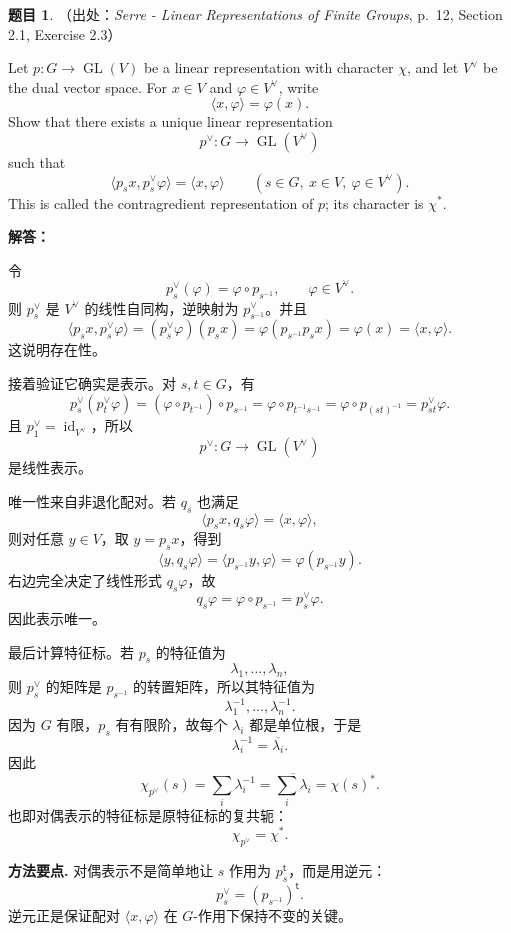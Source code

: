 \documentclass[a4paper]{ctexart}
\theoremstyle{definition}
\newtheorem{example}{题目}[section]
\theoremstyle{analysis}
\theoremstyle{plain}
\begin{document}
\begin{example}
（出处：\textit{Serre - Linear Representations of Finite Groups}, p.~12, Section 2.1, Exercise 2.3）

Let \(p:G\to \operatorname{GL}(V)\) be a linear representation with character
\(\chi\), and let \(V^\vee\) be the dual vector space. For \(x\in V\) and
\(\varphi\in V^\vee\), write
\[
  \langle x,\varphi\rangle=\varphi(x).
\]
Show that there exists a unique linear representation
\[
  p^\vee:G\to \operatorname{GL}(V^\vee)
\]
such that
\[
  \langle p_sx,p^\vee_s\varphi\rangle=\langle x,\varphi\rangle
  \qquad
  (s\in G,\ x\in V,\ \varphi\in V^\vee).
\]
This is called the contragredient representation of \(p\); its character is
\(\chi^*\).

\textbf{解答：}

令
\[
  p^\vee_s(\varphi)=\varphi\circ p_{s^{-1}},
  \qquad \varphi\in V^\vee.
\]
则 \(p^\vee_s\) 是 \(V^\vee\) 的线性自同构，逆映射为 \(p^\vee_{s^{-1}}\)。并且
\[
  \langle p_sx,p^\vee_s\varphi\rangle
  =
  (p^\vee_s\varphi)(p_sx)
  =
  \varphi(p_{s^{-1}}p_sx)
  =
  \varphi(x)
  =
  \langle x,\varphi\rangle.
\]
这说明存在性。

接着验证它确实是表示。对 \(s,t\in G\)，有
\[
  p^\vee_s(p^\vee_t\varphi)
  =
  (\varphi\circ p_{t^{-1}})\circ p_{s^{-1}}
  =
  \varphi\circ p_{t^{-1}s^{-1}}
  =
  \varphi\circ p_{(st)^{-1}}
  =
  p^\vee_{st}\varphi.
\]
且 \(p^\vee_1=\operatorname{id}_{V^\vee}\)，所以
\[
  p^\vee:G\to \operatorname{GL}(V^\vee)
\]
是线性表示。

唯一性来自非退化配对。若 \(q_s\) 也满足
\[
  \langle p_sx,q_s\varphi\rangle=\langle x,\varphi\rangle,
\]
则对任意 \(y\in V\)，取 \(y=p_sx\)，得到
\[
  \langle y,q_s\varphi\rangle
  =
  \langle p_{s^{-1}}y,\varphi\rangle
  =
  \varphi(p_{s^{-1}}y).
\]
右边完全决定了线性形式 \(q_s\varphi\)，故
\[
  q_s\varphi=\varphi\circ p_{s^{-1}}=p^\vee_s\varphi.
\]
因此表示唯一。

最后计算特征标。若 \(p_s\) 的特征值为
\[
  \lambda_1,\ldots,\lambda_n,
\]
则 \(p^\vee_s\) 的矩阵是 \(p_{s^{-1}}\) 的转置矩阵，所以其特征值为
\[
  \lambda_1^{-1},\ldots,\lambda_n^{-1}.
\]
因为 \(G\) 有限，\(p_s\) 有有限阶，故每个 \(\lambda_i\) 都是单位根，于是
\[
  \lambda_i^{-1}=\overline{\lambda_i}.
\]
因此
\[
  \chi_{p^\vee}(s)
  =
  \sum_i\lambda_i^{-1}
  =
  \overline{\sum_i\lambda_i}
  =
  \chi(s)^*.
\]
也即对偶表示的特征标是原特征标的复共轭：
\[
  \chi_{p^\vee}=\chi^*.
\]

\textbf{方法要点.}
对偶表示不是简单地让 \(s\) 作用为 \(p_s^\mathsf{t}\)，而是用逆元：
\[
  p^\vee_s=(p_{s^{-1}})^\mathsf{t}.
\]
逆元正是保证配对
\(\langle x,\varphi\rangle\)
在 \(G\)-作用下保持不变的关键。
\end{example}
\end{document}
